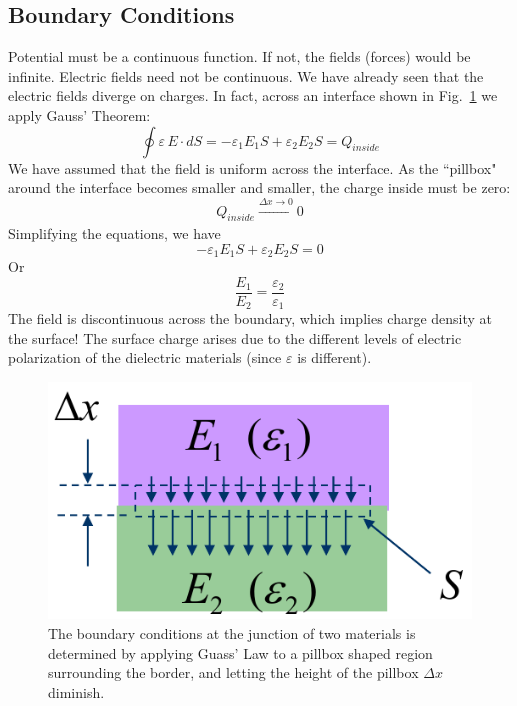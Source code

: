 \subsection{Boundary Conditions}
Potential must be a continuous function. If not, the fields (forces) would be infinite.  
 Electric fields need not be continuous. We have already seen that the electric fields diverge on charges. In fact, across an interface shown in Fig.~\ref{fig:mod2-2_ICtech_sld_16} we apply Gauss' Theorem: 
    \begin{equation} 
        \oint {\varepsilon \,E \cdot dS = - {\varepsilon _1}{E_1}S + {\varepsilon _2}{E_2}S = {Q_{inside}}}
    \end{equation}
We have assumed that the field is uniform across the interface.  As the ``pillbox" around the interface becomes smaller and smaller, the charge inside must be zero:
    \begin{equation} 
        Q_{inside} \xrightarrow[]{\Delta x \rightarrow 0} 0 
    \end{equation}
Simplifying the equations, we have 
    \begin{equation}  
        - {\varepsilon _1}{E_1}S + {\varepsilon _2}{E_2}S = 0
    \end{equation}
Or
    \begin{equation} 
        \frac{{{E_1}}}{{{E_2}}} = \frac{{{\varepsilon _2}}}{{{\varepsilon _1}}} 
    \end{equation}
The field is discontinuous across the boundary, which implies charge density at the surface!  The surface charge arises due to the different levels of electric polarization of the dielectric materials (since $\varepsilon$ is different).
\begin{figure}[tb]
\centering
\includegraphics[width=.35\columnwidth]{mod2-2_ICtech_sld_16}
\caption{The boundary conditions at the junction of two materials is determined by applying Guass' Law to a pillbox shaped region surrounding the border, and letting the height of the pillbox $\Delta x$ diminish.}
\label{fig:mod2-2_ICtech_sld_16}
\end{figure}
